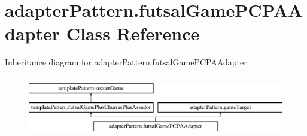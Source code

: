 \hypertarget{classadapter_pattern_1_1futsal_game_p_c_p_a_adapter}{}\section{adapter\+Pattern.\+futsal\+Game\+P\+C\+P\+A\+Adapter Class Reference}
\label{classadapter_pattern_1_1futsal_game_p_c_p_a_adapter}
Inheritance diagram for adapter\+Pattern.\+futsal\+Game\+P\+C\+P\+A\+Adapter\+:\begin{figure}[H]
\begin{center}
\leavevmode
\includegraphics[height=2.683706cm]{classadapter_pattern_1_1futsal_game_p_c_p_a_adapter}
\end{center}
\end{figure}
